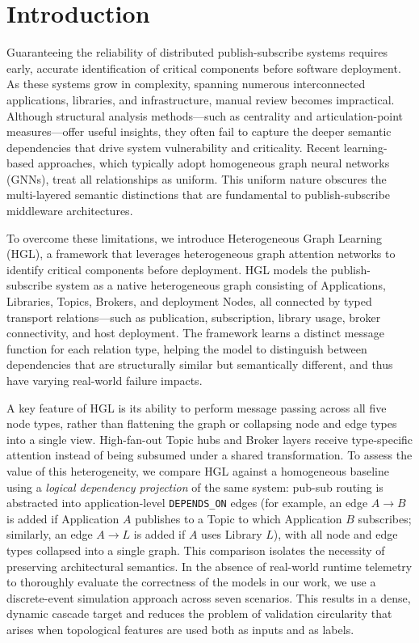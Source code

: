 \documentclass[sigconf,9pt,anonymous]{acmart}
\begin{document}
\section{Introduction}

Guaranteeing the reliability of distributed publish-subscribe systems requires early, accurate identification of critical components before software deployment. As these systems grow in complexity, spanning numerous interconnected applications, libraries, and infrastructure, manual review becomes impractical. Although structural analysis methods—such as centrality and articulation-point measures—offer useful insights, they often fail to capture the deeper semantic dependencies that drive system vulnerability and criticality. Recent learning-based approaches, which typically adopt homogeneous graph neural networks (GNNs), treat all relationships as uniform. This uniform nature obscures the multi-layered semantic distinctions that are fundamental to publish-subscribe middleware architectures.

To overcome these limitations, we introduce Heterogeneous Graph Learning (HGL), a framework that leverages heterogeneous graph attention networks to identify critical components before deployment. HGL models the publish-subscribe system as a native heterogeneous graph consisting of Applications, Libraries, Topics, Brokers, and deployment Nodes, all connected by typed transport relations—such as publication, subscription, library usage, broker connectivity, and host deployment. The framework learns a distinct message function for each relation type, helping the model to distinguish between dependencies that are structurally similar but semantically different, and thus have varying real-world failure impacts.

A key feature of HGL is its ability to perform message passing across all five node types, rather than flattening the graph or collapsing node and edge types into a single view. High-fan-out Topic hubs and Broker layers receive type-specific attention instead of being subsumed under a shared transformation. To assess the value of this heterogeneity, we compare HGL against a homogeneous baseline using a \emph{logical dependency projection} of the same system: pub-sub routing is abstracted into application-level \texttt{DEPENDS\_ON} edges (for example, an edge $A \rightarrow B$ is added if Application $A$ publishes to a Topic to which Application $B$ subscribes; similarly, an edge $A \rightarrow L$ is added if $A$ uses Library $L$), with all node and edge types collapsed into a single graph. This comparison isolates the necessity of preserving architectural semantics. In the absence of real-world runtime telemetry to thoroughly evaluate the correctness of the models in our work, we use a discrete-event simulation approach across seven scenarios. This results in a dense, dynamic cascade target and reduces the problem of validation circularity that arises when topological features are used both as inputs and as labels.
\end{document}
